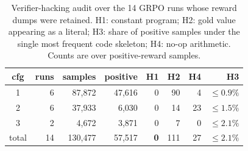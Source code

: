 \begin{table}[t]\centering\small
\setlength{\tabcolsep}{3.5pt}
\caption{Verifier-hacking audit over the 14 GRPO runs whose reward dumps were
retained. H1: constant program; H2: gold value appearing as a literal; H3:
share of positive samples under the single most frequent code skeleton; H4:
no-op arithmetic. Counts are over positive-reward samples.}
\label{tab:supp-hacking}
\begin{tabular}{c rrr rrr r}
\toprule
cfg & runs & samples & positive & H1 & H2 & H4 & H3 \\
\midrule
1 & 6 & 87{,}872 & 47{,}616 & 0 & 90 & 4 & $\leq 0.9\%$ \\
2 & 6 & 37{,}933 & 6{,}030 & 0 & 14 & 23 & $\leq 1.5\%$ \\
3 & 2 & 4{,}672 & 3{,}871 & 0 & 7 & 0 & $\leq 2.1\%$ \\
\midrule
total & 14 & 130{,}477 & 57{,}517 & \textbf{0} & 111 & 27 & $\leq 2.1\%$ \\
\bottomrule
\end{tabular}
\end{table}
